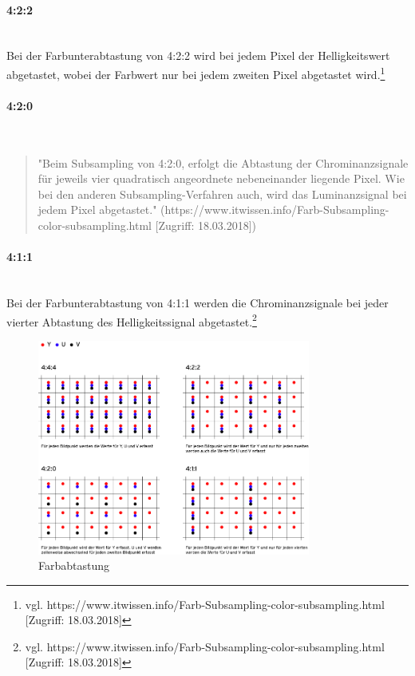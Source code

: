 \paragraph{4:2:2}
\leavevmode \\
Bei der Farbunterabtastung von 4:2:2 wird bei jedem Pixel der Helligkeitswert abgetastet, wobei der Farbwert nur bei jedem zweiten Pixel abgetastet wird.\footnote{\label{}vgl. https://www.itwissen.info/Farb-Subsampling-color-subsampling.html [Zugriff: 18.03.2018]}
\paragraph{4:2:0}
\leavevmode \\
\begin{quote}"Beim Subsampling von 4:2:0, erfolgt die Abtastung der Chrominanzsignale für jeweils vier quadratisch angeordnete nebeneinander liegende Pixel. Wie bei den anderen Subsampling-Verfahren auch, wird das Luminanzsignal bei jedem Pixel abgetastet." (https://www.itwissen.info/Farb-Subsampling-color-subsampling.html [Zugriff: 18.03.2018])\end{quote}
\paragraph{4:1:1}
\leavevmode \\
Bei der Farbunterabtastung von 4:1:1 werden die Chrominanzsignale bei jeder vierter Abtastung des Helligkeitssignal abgetastet.\footnote{\label{}vgl. https://www.itwissen.info/Farb-Subsampling-color-subsampling.html [Zugriff: 18.03.2018]}
\begin{figure}[H]
	\centering	
	\includegraphics[width=0.8\textwidth]{abb15} 
	\caption{Farbabtastung}
\end{figure}
